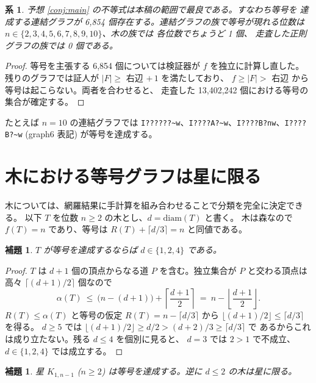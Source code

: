 \documentclass[paper=a4,fontsize=10.5pt,jafontsize=10.5pt]{jlreq}
\theoremstyle{plain}
\newtheorem{lemma}[theorem]{補題}
\newtheorem{corollary}[theorem]{系}
\theoremstyle{definition}
\begin{document}
\begin{corollary}\label{cor:eq}
予想 \ref{conj:main} の不等式は本稿の範囲で最良である。すなわち等号を
達成する連結グラフが 6,854 個存在する。連結グラフの族で等号が現れる位数は
$n \in \{2, 3, 4, 5, 6, 7, 8, 9, 10\}$、木の族では 各位数でちょうど 1 個、
走査した正則グラフの族では 0 個である。
\end{corollary}

\begin{proof}
等号を主張する 6,854 個については検証器が $f$ を独立に計算し直した。
残りのグラフでは証人が $|F| \ge$ 右辺 $+\,1$ を満たしており、
$f \ge |F| >$ 右辺 から等号は起こらない。両者を合わせると、
走査した 13,402,242 個における等号の集合が確定する。
\end{proof}

たとえば $n = 10$ の連結グラフでは \texttt{I??????\textasciitilde{}w}、\texttt{I????A?\textasciitilde{}w}、\texttt{I????B?nw}、\texttt{I????B?\textasciitilde{}w} (graph6 表記) が等号を達成する。

\section{木における等号グラフは星に限る}\label{sec:trees}

木については、網羅結果に手計算を組み合わせることで分類を完全に決定できる。
以下 $T$ を位数 $n \ge 2$ の木とし、$d = \mathrm{diam}(T)$ と書く。
木は森なので $f(T) = n$ であり、等号は
$R(T) + \lceil d/3 \rceil = n$ と同値である。

\begin{lemma}\label{lem:treediam}
$T$ が等号を達成するならば $d \in \{1, 2, 4\}$ である。
\end{lemma}

\begin{proof}
$T$ は $d+1$ 個の頂点からなる道 $P$ を含む。独立集合が $P$ と交わる頂点は
高々 $\lceil (d+1)/2 \rceil$ 個なので
\[ \alpha(T) \ \le \ \bigl(n - (d+1)\bigr) + \left\lceil \frac{d+1}{2} \right\rceil
   \ = \ n - \left\lfloor \frac{d+1}{2} \right\rfloor . \]
$R(T) \le \alpha(T)$ \cite{fms1991} と等号の仮定 $R(T) = n - \lceil d/3 \rceil$ から
$\lfloor (d+1)/2 \rfloor \le \lceil d/3 \rceil$ を得る。
$d \ge 5$ では $\lfloor (d+1)/2 \rfloor \ge d/2 > (d+2)/3 \ge \lceil d/3 \rceil$ で
あるからこれは成り立たない。残る $d \le 4$ を個別に見ると、
$d = 3$ では $2 > 1$ で不成立、$d \in \{1,2,4\}$ では成立する。
\end{proof}

\begin{lemma}\label{lem:star}
星 $K_{1,n-1}$ ($n \ge 2$) は等号を達成する。逆に $d \le 2$ の木は星に限る。
\end{lemma}
\end{document}
